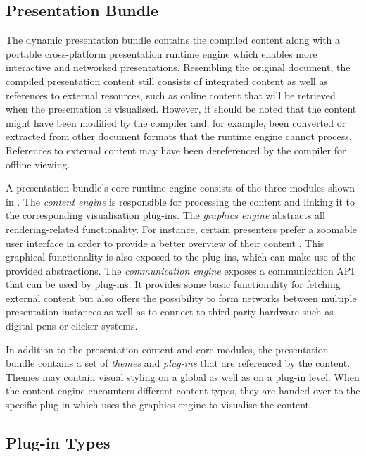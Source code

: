    \subsection{\mxp Presentation Bundle}

    The dynamic \mxp presentation bundle contains the compiled content along
    with a portable cross-platform presentation runtime engine which enables
    more interactive and networked presentations. Resembling the original
    document, the compiled presentation content still consists of integrated
    content as well as references to external resources, such as online content
    that will be retrieved when the presentation is visualised. However, it
    should be noted that the content might have been modified by the compiler
    and, for example, been converted or extracted from other document formats
    that the runtime engine cannot process. References to external content may
    have been dereferenced by the compiler for offline viewing.


    A presentation bundle's core runtime engine consists of the three modules
    shown in . The \emph{content engine} is responsible
    for processing the content and linking it to the corresponding
    visualisation plug-ins. The \emph{graphics engine} abstracts all
    rendering-related functionality. For instance, certain presenters prefer a
    zoomable user interface in order to provide a better overview of their
    content \citep{reuss-1}. This graphical functionality is also exposed to
    the plug-ins, which can make use of the provided abstractions. The
    \emph{communication engine} exposes a communication API that can be used by
    plug-ins. It provides some basic functionality for fetching external
    content but also offers the possibility to form networks between multiple
    \mxp presentation instances as well as to connect to third-party hardware
    such as digital pens or clicker systems.

    In addition to the presentation content and core modules, the presentation
    bundle contains a set of \emph{themes} and \emph{plug-ins} that are
    referenced by the content. Themes may contain visual styling on a global as
    well as on a plug-in level. When the content engine encounters different
    content types, they are handed over to the specific plug-in which uses the
    graphics engine to visualise the content.

   \subsection{Plug-in Types}

